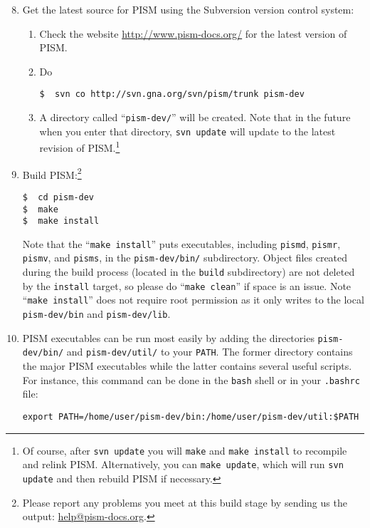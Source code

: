 \documentclass[11pt,final]{amsart}
\renewcommand{\t}[1]{\texttt{#1}}
\begin{document}
\begin{enumerate}\setcounter{enumi}{7}
\item Get the latest source for PISM using the Subversion version control system:
\begin{enumerate}
\item \label{getPISMstep} Check the website \url{http://www.pism-docs.org/} for the latest version of PISM.
\item Do
\begin{verbatim}
$  svn co http://svn.gna.org/svn/pism/trunk pism-dev
\end{verbatim}
\item A directory called ``\verb|pism-dev/|'' will be created.  Note that in the future when you enter that directory, \verb|svn update| will update to the latest revision of PISM.\footnote{Of course, after \t{svn update} you will \t{make} and \t{make install} to recompile and relink PISM. Alternatively, you can \t{make update}, which will run \t{svn update} and then rebuild PISM if necessary.}
\end{enumerate}

\item Build PISM:\footnote{Please report any problems you meet at this build stage by sending us the output: \href{mailto:help@pism-docs.org}{help@pism-docs.org}.}
\begin{verbatim}
$  cd pism-dev
$  make
$  make install
\end{verbatim}
\noindent  Note that the ``\verb|make install|'' puts executables, including \verb|pismd|, \verb|pismr|, \verb|pismv|, and \verb|pisms|, in the \verb|pism-dev/bin/| subdirectory. Object files created during the build process (located in the \verb|build| subdirectory) are not deleted by the \verb|install| target, so please do ``\verb|make clean|'' if space is an issue. Note ``\verb|make install|'' does not require root permission as it only writes to the local \verb|pism-dev/bin| and \verb|pism-dev/lib|.

\item PISM executables can be run most easily by adding the directories \verb|pism-dev/bin/| and \verb|pism-dev/util/| to your \verb|PATH|.  The former directory contains the major PISM executables while the latter contains several useful scripts.  For instance, this command can be done in the \verb|bash| shell or in your \verb|.bashrc| file:
\begin{verbatim}
export PATH=/home/user/pism-dev/bin:/home/user/pism-dev/util:$PATH
\end{verbatim}
\end{enumerate}
\end{document}
